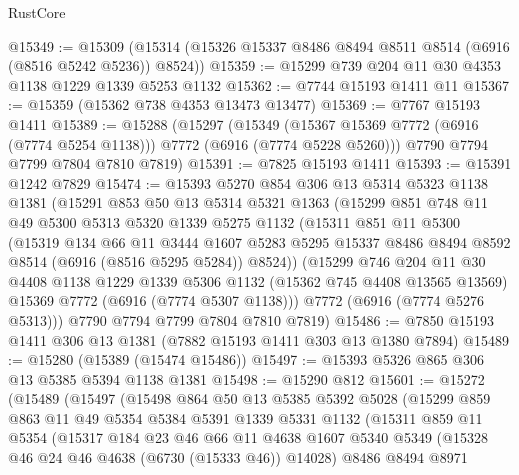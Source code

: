 \begin{lexlean}{RustCore}
\begin{coremodule}
@15349 := @15309 (@15314 (@15326 @15337 @8486 @8494 @8511 @8514 (@6916 (@8516 @5242 @5236)) @8524))
@15359 := @15299 @739 @204 @11 @30 @4353 @1138 @1229 @1339 @5253 @1132
@15362 := @7744 @15193 @1411 @11
@15367 := @15359 (@15362 @738 @4353 @13473 @13477)
@15369 := @7767 @15193 @1411
@15389 := @15288
    (@15297
      (@15349 (@15367 @15369 @7772 (@6916 (@7774 @5254 @1138))) @7772 (@6916 (@7774 @5228 @5260)))
      @7790
      @7794
      @7799
      @7804
      @7810
      @7819)
@15391 := @7825 @15193 @1411
@15393 := @15391 @1242 @7829
@15474 := @15393
    @5270
    @854
    @306
    @13
    @5314
    @5323
    @1138
    @1381
    (@15291
      @853
      @50
      @13
      @5314
      @5321
      @1363
      (@15299
        @851
        @748
        @11
        @49
        @5300
        @5313
        @5320
        @1339
        @5275
        @1132
        (@15311
          @851
          @11
          @5300
          (@15319
            @134
            @66
            @11
            @3444
            @1607
            @5283
            @5295
            @15337
            @8486
            @8494
            @8592
            @8514
            (@6916 (@8516 @5295 @5284))
            @8524))
        (@15299
          @746
          @204
          @11
          @30
          @4408
          @1138
          @1229
          @1339
          @5306
          @1132
          (@15362 @745 @4408 @13565 @13569)
          @15369
          @7772
          (@6916 (@7774 @5307 @1138)))
        @7772
        (@6916 (@7774 @5276 @5313)))
      @7790
      @7794
      @7799
      @7804
      @7810
      @7819)
@15486 := @7850 @15193 @1411 @306 @13 @1381 (@7882 @15193 @1411 @303 @13 @1380 @7894)
@15489 := @15280 (@15389 (@15474 @15486))
@15497 := @15393 @5326 @865 @306 @13 @5385 @5394 @1138 @1381
@15498 := @15290 @812
@15601 := @15272
    (@15489
      (@15497
        (@15498
          @864
          @50
          @13
          @5385
          @5392
          @5028
          (@15299
            @859
            @863
            @11
            @49
            @5354
            @5384
            @5391
            @1339
            @5331
            @1132
            (@15311
              @859
              @11
              @5354
              (@15317
                @184
                @23
                @46
                @66
                @11
                @4638
                @1607
                @5340
                @5349
                (@15328 @46 @24 @46 @4638 (@6730 (@15333 @46)) @14028)
                @8486
                @8494
                @8971

\end{coremodule}
\end{lexlean}
